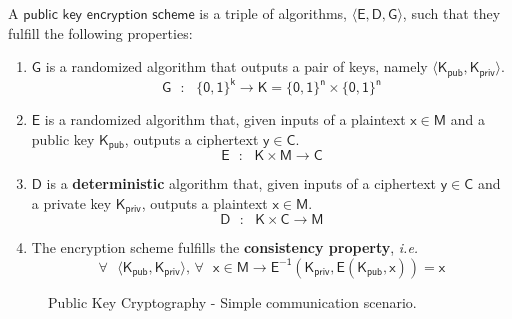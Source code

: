\documentclass{article}
\begin{document}
\begin{boxH}
    A $\mathsf{public}$ $\mathsf{key}$ $\mathsf{encryption}$ $\mathsf{scheme}$ is a triple of algorithms, $\mathsf{\langle E, D, G\rangle}$, such that they fulfill the following properties:

    \begin{enumerate}
        \item $\mathsf{G}$ is a randomized algorithm that outputs a pair of keys, namely $\mathsf{\langle K_{pub}, K_{priv} \rangle}$.
        $$
            \mathsf{G \text{ } : \text{ } \{0,1\}^{k} \rightarrow K = \{0,1\}^{n} \times \{0,1\}^{n}}
        $$
        \item $\mathsf{E}$ is a randomized algorithm that, given inputs of a plaintext $\mathsf{x \in M}$ and a public key $\mathsf{K_{pub}}$, outputs a ciphertext $\mathsf{y \in C}$.
        $$
        \mathsf{E \text{ } : \text{ } K \times M \rightarrow C}
        $$
        \item $\mathsf{D}$ is a \textbf{deterministic} algorithm that, given inputs of a ciphertext $\mathsf{y \in C}$ and a private key $\mathsf{K_{priv}}$, outputs a plaintext $\mathsf{x \in M}$.
        $$
        \mathsf{D \text{ } : \text{ } K \times C \rightarrow M}
        $$
        \item The encryption scheme fulfills the \textbf{consistency property}, \textit{i.e.}
        $$
            \mathsf{\forall \text{ } \langle K_{pub}, K_{priv} \rangle \text{, } \forall \text{ } x \in M \rightarrow E^{-1}(K_{priv}, E(K_{pub}, x)) = x}
        $$
    \end{enumerate}
\end{boxH}

\begin{figure}
    \centering
    \caption{Public Key Cryptography - Simple communication scenario.}
    \label{fig:pub_key_scenario}
\end{figure}
\end{document}

